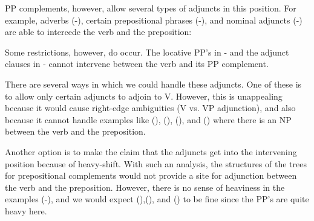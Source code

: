 
PP complements, however, allow several types of adjuncts in this position.
For example, adverbs (-), certain prepositional phrases
(-), and nominal adjuncts (-) are able to intercede
the verb and the preposition:




Some restrictions, however, do occur. The locative PP's in -
and the adjunct clauses in - cannot intervene between the verb
and its PP complement.



There are several ways in which we could handle these adjuncts.  One of
these is to allow only certain adjuncts to adjoin to V.  However, this is
unappealing because it would cause right-edge ambiguities (V vs. VP
adjunction), and also because it cannot handle examples like (),
(), (), and () where there is an NP between the verb
and the preposition.

Another option is to make the claim that the adjuncts get into the
intervening position because of heavy-shift. With such an analysis, the
structures of the trees for prepositional complements would not provide a
site for adjunction between the verb and the preposition.  However, there
is no sense of heaviness in the examples (-), and we would
expect (),(), and () to be fine since the PP's are
quite heavy here.

